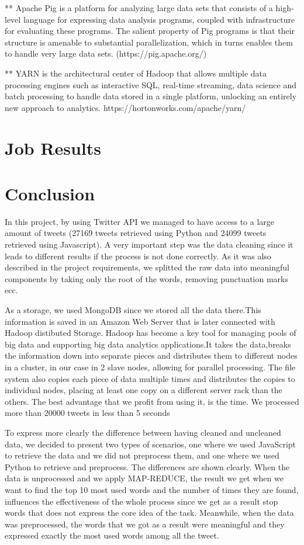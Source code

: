 \documentclass{article}
\begin{document}
        ** Apache Pig is a platform for analyzing large data sets that consists of a high-level language for expressing data analysis programs, coupled with infrastructure for evaluating these programs. 
        The salient property of Pig programs is that their structure is amenable to substantial parallelization, which in turns enables them to handle very large data sets. 
        (https://pig.apache.org/)

        ** YARN is the architectural center of Hadoop that allows multiple data processing engines such as interactive SQL, real-time streaming, data science and batch processing to handle data stored 
        in a single platform, unlocking an entirely new approach to analytics.
        https://hortonworks.com/apache/yarn/
        \section{Job Results}
		\pagebreak        
        \section{Conclusion}
In this project, by using Twitter API we managed to have access to a large amount of tweets (27169 tweets retrieved using Python and 24099 tweets retrieved using Javascript). A very important step was the data cleaning since it leads to different results if the process is not done correctly. As it was also described in the project requirements, we splitted the raw data into meaningful components by taking only the root of the words, removing punctuation marks ecc.

 As a storage, we used MongoDB since we stored all the data there.This information is saved in an Amazon Web Server that is later connected with Hadoop distibuted Storage. Hadoop has become a key tool for managing pools of big data and supporting big data analytics applications.It takes the data,breaks the information down into separate pieces and distributes them to different nodes in a cluster, in our case in 2 slave nodes, allowing for parallel processing. The file system also copies each piece of data multiple times and distributes the copies to individual nodes, placing at least one copy on a different server rack than the others. The best advantage that we profit from using it, is the time. We processed more than 20000 tweets in less than 5 seconds

To express more clearly the difference between having cleaned and uncleaned data, we decided to present two types of scenarios, one where we used JavaScript to retrieve the data and we did not preprocess them, and one where we used Python to retrieve and preprocess. The differences are shown clearly. When the data is unprocessed and we apply MAP-REDUCE, the result we get when we want to find the top 10 most used words and the number of times they are found, influences the effectiveness of the whole process since we get as a result stop words that does not express the core idea of the task. Meanwhile, when the data was preprocessed, the words that we got as a result were meaningful and they expressed exactly the most used words among all the tweet.


      
    
    
    \nocite{*}
\end{document}
